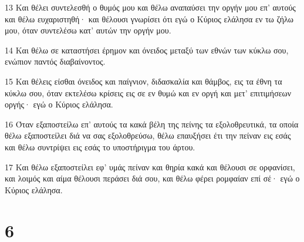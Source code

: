 \par 13 Και θέλει συντελεσθή ο θυμός μου και θέλω αναπαύσει την οργήν μου επ' αυτούς και θέλω ευχαριστηθή· και θέλουσι γνωρίσει ότι εγώ ο Κύριος ελάλησα εν τω ζήλω μου, όταν συντελέσω κατ' αυτών την οργήν μου.
\par 14 Και θέλω σε καταστήσει έρημον και όνειδος μεταξύ των εθνών των κύκλω σου, ενώπιον παντός διαβαίνοντος.
\par 15 Και θέλεις είσθαι όνειδος και παίγνιον, διδασκαλία και θάμβος, εις τα έθνη τα κύκλω σου, όταν εκτελέσω κρίσεις εις σε εν θυμώ και εν οργή και μετ' επιτιμήσεων οργής· εγώ ο Κύριος ελάλησα.
\par 16 Όταν εξαποστείλω επ' αυτούς τα κακά βέλη της πείνης τα εξολοθρευτικά, τα οποία θέλω εξαποστείλει διά να σας εξολοθρεύσω, θέλω επαυξήσει έτι την πείναν εις εσάς και θέλω συντρίψει εις εσάς το υποστήριγμα του άρτου.
\par 17 Και θέλω εξαποστείλει εφ' υμάς πείναν και θηρία κακά και θέλουσι σε ορφανίσει, και λοιμός και αίμα θέλουσι περάσει διά σου, και θέλω φέρει ρομφαίαν επί σέ· εγώ ο Κύριος ελάλησα.

\chapter{6}

